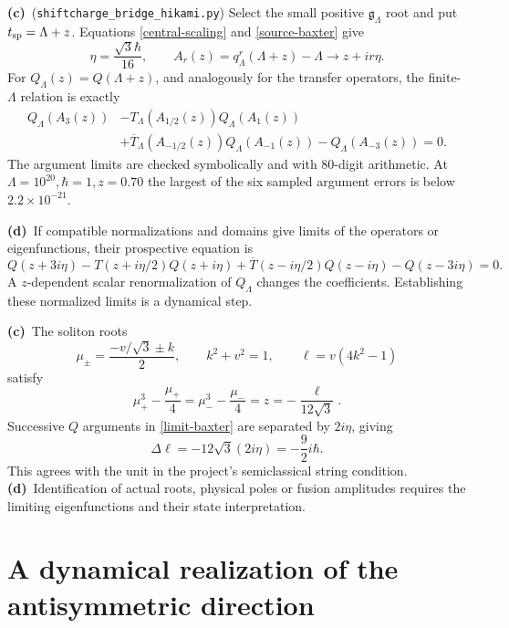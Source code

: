 \documentclass[11pt,a4paper]{article}
\newcommand{\C}{\textbf{(c)}\ }
\newcommand{\D}{\textbf{(d)}\ }
\newcommand{\file}[1]{\nolinkurl{#1}}
\newcommand{\hk}{\file{shiftcharge_bridge_hikami.py}}
\begin{document}
\C (\hk) Select the small positive $\mathfrak g_\Lambda$ root and
put $t_{\rm sp}=\Lambda+z$. Equations \eqref{central-scaling} and
\eqref{source-baxter} give
\begin{equation}
 \eta=\frac{\sqrt3\hbar}{16},\qquad
 A_r(z)=q_\Lambda^r(\Lambda+z)-\Lambda
 \longrightarrow z+ir\eta .
 \label{arguments}
\end{equation}
For $Q_\Lambda(z)=Q(\Lambda+z)$, and analogously for the transfer
operators, the finite-$\Lambda$ relation is exactly
\begin{align}
 Q_\Lambda(A_3(z))
 &-T_\Lambda(A_{1/2}(z))Q_\Lambda(A_1(z))\nonumber\\
 &+\overline T_\Lambda(A_{-1/2}(z))Q_\Lambda(A_{-1}(z))
 -Q_\Lambda(A_{-3}(z))=0 .
 \label{finite-baxter}
\end{align}
The argument limits are checked symbolically and with 80-digit arithmetic.
At $\Lambda=10^{20},\hbar=1,z=0.70$ the largest of the six sampled
argument errors is below $2.2\times10^{-21}$.

\D If compatible normalizations and domains give limits of the operators
or eigenfunctions, their prospective equation is
\begin{equation}
 Q(z+3i\eta)-T(z+i\eta/2)Q(z+i\eta)
 +\overline T(z-i\eta/2)Q(z-i\eta)-Q(z-3i\eta)=0.
 \label{limit-baxter}
\end{equation}
A $z$-dependent scalar renormalization of $Q_\Lambda$ changes the
coefficients. Establishing these normalized limits is a dynamical step.

\C The soliton roots
\begin{equation}
 \mu_\pm=\frac{-v/\sqrt3\pm k}{2},\qquad
 k^2+v^2=1,\qquad \ell=v(4k^2-1)
\end{equation}
satisfy
\begin{equation}
 \mu_+^3-\frac{\mu_+}4
 =\mu_-^3-\frac{\mu_-}4
 =z=-\frac{\ell}{12\sqrt3}.
 \label{spectral}
\end{equation}
Successive $Q$ arguments in \eqref{limit-baxter} are separated by
$2i\eta$, giving
\begin{equation}
 \Delta\ell=-12\sqrt3(2i\eta)=-\frac92i\hbar .
 \label{spacing}
\end{equation}
This agrees with the unit in the project's semiclassical string condition.
\D Identification of actual roots, physical poles or fusion amplitudes
requires the limiting eigenfunctions and their state interpretation.

\section{A dynamical realization of the antisymmetric direction}
\end{document}
